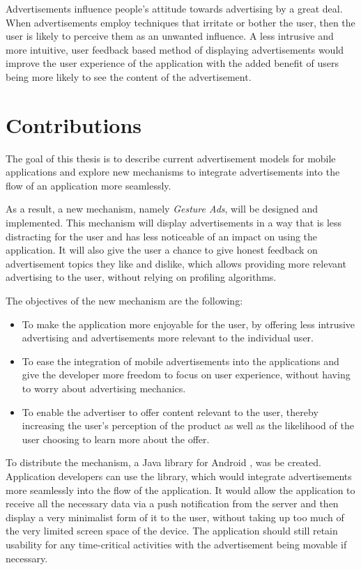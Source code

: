 Advertisements influence people's attitude towards advertising by a great deal. When advertisements employ techniques that irritate or bother the user, then the user is likely to perceive them as an unwanted influence.\cite{chowdhury2010consumer} A less intrusive and more intuitive, user feedback based method of displaying advertisements would improve the user experience of the application with the added benefit of users being more likely to see the content of the advertisement.

\section{Contributions}
The goal of this thesis is to describe current advertisement models for mobile applications and explore new mechanisms to integrate advertisements into the flow of an application more seamlessly.

As a result, a new mechanism, namely \textit{Gesture Ads}, will be designed and implemented. This mechanism will display advertisements in a way that is less distracting for the user and has less noticeable of an impact on using the application. It will also give the user a chance to give honest feedback on advertisement topics they like and dislike, which allows providing more relevant advertising to the user, without relying on profiling algorithms.

The objectives of the new mechanism are the following:
\begin{itemize}
  \item To make the application more enjoyable for the user, by offering less intrusive advertising and advertisements more relevant to the individual user.
  \item To ease the integration of mobile advertisements into the applications and give the developer more freedom to focus on user experience, without having to worry about advertising mechanics.
  \item To enable the advertiser to offer content relevant to the user, thereby increasing the user's perception of the product as well as the likelihood of the user choosing to learn more about the offer.
\end{itemize}

To distribute the mechanism, a Java library for Android \cite{android:platform}, was be created. Application developers can use the library, which would integrate advertisements more seamlessly into the flow of the application. It would allow the application to receive all the necessary data via a push notification from the server and then display a very minimalist form of it to the user, without taking up too much of the very limited screen space of the device. The application should still retain usability for any time-critical activities with the advertisement being movable if necessary.

